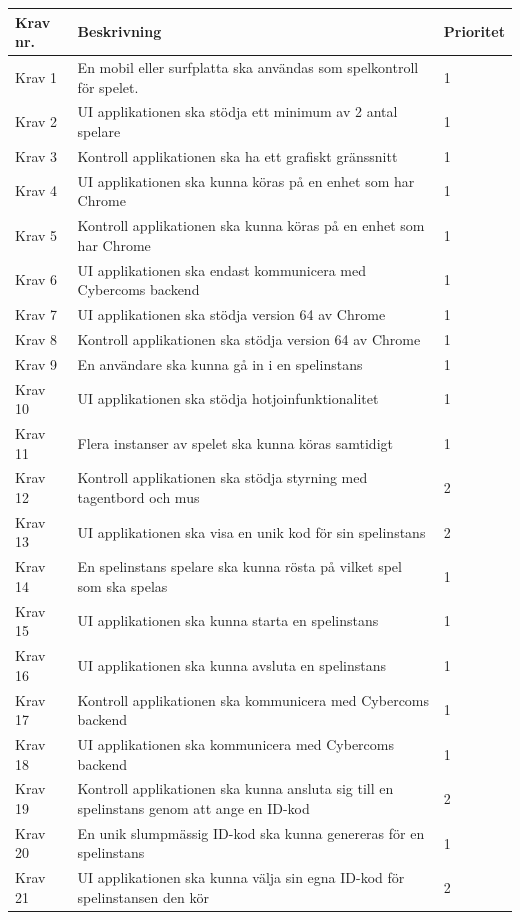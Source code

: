 \documentclass[10pt]{article}
\begin{document}
	\begin{tabular}{| p{2cm} | p{8cm} | p{2cm}|}
		\hline
		
		\textbf{Krav nr.} & \textbf{Beskrivning} &\textbf{Prioritet} \\ \hline
		Krav 1 & En mobil eller surfplatta ska användas som spelkontroll för spelet. & 1 \\ \hline
		Krav 2 & UI applikationen ska stödja ett minimum av 2 antal spelare & 1 \\ \hline
		Krav 3 & Kontroll applikationen ska ha ett grafiskt gränssnitt   & 1 \\ \hline
		Krav 4 & UI applikationen ska kunna köras på en enhet som har Chrome & 1 \\ \hline
		Krav 5 & Kontroll applikationen ska kunna köras på en enhet som har Chrome & 1 \\ \hline
		Krav 6 & UI applikationen ska endast kommunicera med Cybercoms backend & 1 \\ \hline
		Krav 7 & UI applikationen ska stödja version 64 av Chrome & 1 \\ \hline
		Krav 8 & Kontroll applikationen ska stödja version 64 av Chrome & 1 \\ \hline
		Krav 9 & En användare ska kunna gå in i en spelinstans & 1 \\ \hline
		Krav 10 & UI applikationen ska stödja hotjoinfunktionalitet & 1 \\ \hline
		Krav 11 & Flera instanser av spelet ska kunna köras samtidigt & 1 \\ \hline
		Krav 12 & Kontroll applikationen ska stödja styrning med tagentbord och mus & 2 \\ \hline
		Krav 13 & UI applikationen ska visa en unik kod för sin spelinstans & 2 \\ \hline
		Krav 14 & En spelinstans spelare ska kunna rösta på vilket spel som ska spelas & 1 \\ \hline
		Krav 15 & UI applikationen ska kunna starta en spelinstans & 1 \\ \hline
		Krav 16 & UI applikationen ska kunna avsluta en spelinstans & 1 \\ \hline
		Krav 17 & Kontroll applikationen ska kommunicera med Cybercoms backend & 1 \\ \hline
		Krav 18 & UI applikationen ska kommunicera med Cybercoms backend & 1\\ \hline
		Krav 19 & Kontroll applikationen ska kunna ansluta sig till en spelinstans genom att ange en ID-kod & 2 \\ \hline
		Krav 20 & En unik slumpmässig ID-kod ska kunna genereras för en spelinstans & 1 \\ \hline
		Krav 21 & UI applikationen ska kunna välja sin egna ID-kod för spelinstansen den kör & 2 \\ \hline
		
		
		
	\end{tabular}
	
\end{document}
